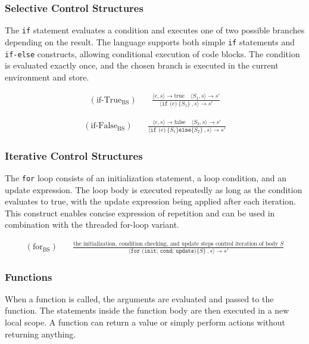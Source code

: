 \subsubsection{Selective Control Structures}

The \texttt{if} statement evaluates a condition and executes one of two possible branches depending on the result. The language supports both simple \texttt{if} statements and \texttt{if-else} constructs, allowing conditional execution of code blocks. The condition is evaluated exactly once, and the chosen branch is executed in the current environment and store.

\begin{align*}
(\text{if-True}_{\text{BS}}) \quad
&\frac{
  \langle e, s \rangle \rightarrow \text{true} \quad \langle S_1, s \rangle \rightarrow s'
}{
  \langle \texttt{if (}e\texttt{)}\ \{S_1\}\ , s \rangle \rightarrow s'
}
\end{align*}

\begin{align*}
(\text{if-False}_{\text{BS}}) \quad
&\frac{
  \langle e, s \rangle \rightarrow \text{false} \quad \langle S_2, s \rangle \rightarrow s'
}{
  \langle \texttt{if (}e\texttt{)}\ \{S_1\} \texttt{else} \{S_2\}\ , s \rangle \rightarrow s'
}
\end{align*}

\subsubsection{Iterative Control Structures}

The \texttt{for} loop consists of an initialization statement, a loop condition, and an update expression. The loop body is executed repeatedly as long as the condition evaluates to true, with the update expression being applied after each iteration. This construct enables concise expression of repetition and can be used in combination with the threaded for-loop variant.

\begin{align*}
(\text{for}_{\text{BS}}) \quad
&\frac{
  \text{the initialization, condition checking, and update steps control iteration of body } S
}{
  \langle \texttt{for (init; cond; update)} \{S\}\ , s \rangle \rightarrow s'
}
\end{align*}

\subsubsection{Functions}
When a function is called, the arguments are evaluated and passed to the function. The statements inside the function body are then executed in a new local scope. A function can return a value or simply perform actions without returning anything.

